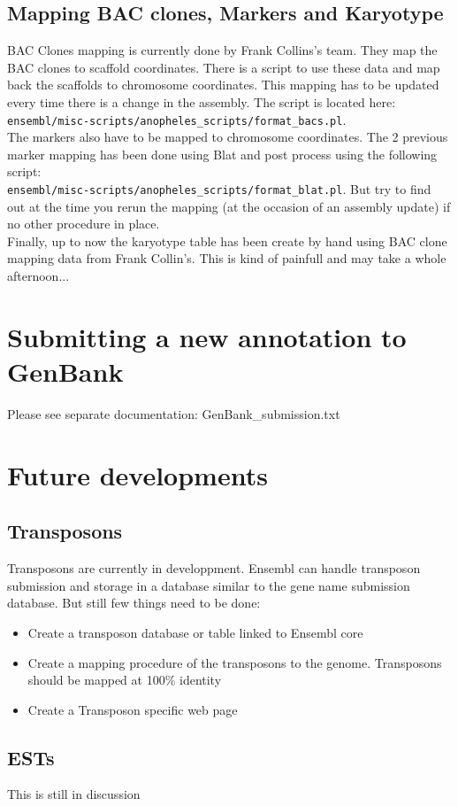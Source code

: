 \documentclass[a4paper,10pt]{article}
\begin{document}
\subsection{Mapping BAC clones, Markers and Karyotype}
BAC Clones mapping is currently done by Frank Collins's team. They map the BAC clones to scaffold coordinates. There is a script to use these data and map back the scaffolds to chromosome coordinates. This mapping has to be updated every time there is a change in the assembly. The script is located here:\\
 \texttt{ensembl/misc-scripts/anopheles\_scripts/format\_bacs.pl}.\\
The markers also have to be mapped to chromosome coordinates. The 2 previous marker mapping has been done using Blat and post process using the following script: \\
\texttt{ensembl/misc-scripts/anopheles\_scripts/format\_blat.pl}. But try to find out at the time you rerun the mapping (at the occasion of an assembly update) if no other procedure in place.\\
Finally, up to now the karyotype table has been create by hand using BAC clone mapping data from Frank Collin's. This is kind of painfull and may take a whole afternoon...

\section{Submitting a new annotation to GenBank}
Please see separate documentation: GenBank_submission.txt

\section{Future developments}
\subsection{Transposons}
Transposons are currently in developpment. Ensembl can handle transposon submission and storage in a database similar to the gene name submission database.
But still few things need to be done:
\begin{itemize}
\item{Create a transposon database or table linked to Ensembl core}
\item{Create a mapping procedure of the transposons to the genome. Transposons should be mapped at 100\% identity}
\item{Create a Transposon specific web page}
\end{itemize}

\subsection{ESTs}
This is still in discussion
\end{document}
